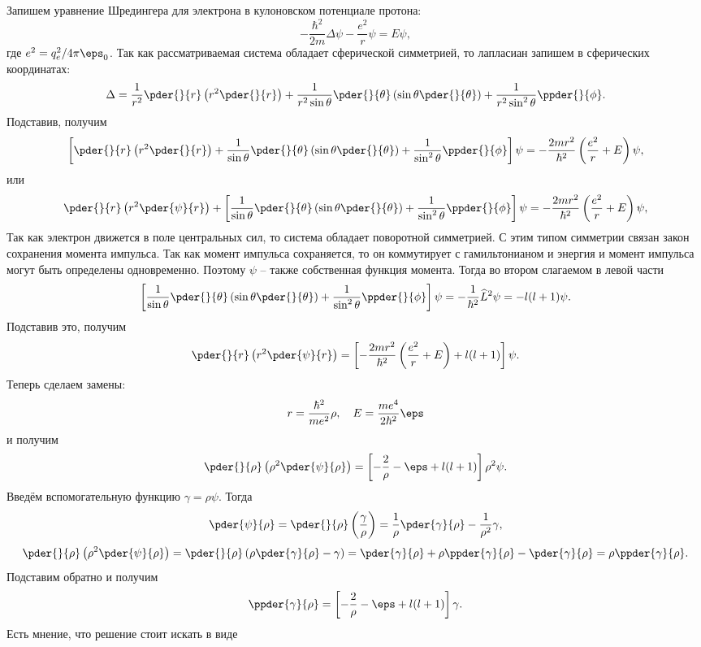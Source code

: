 \documentclass{minimal}
\begin{document}
Запишем уравнение Шредингера для электрона в кулоновском потенциале протона:
\[
    -\frac{\hbar^2}{2m}\Delta\psi - \frac{e^2}{r}\psi = E\psi,
\]
где \( e^2 = q_e^2/4\pi\eps_0 \). Так как рассматриваемая система обладает
сферической симметрией, то лапласиан запишем в сферических координатах:
\[
    \Delta = \frac{1}{r^2}\pder{}{r}\left(r^2\pder{}{r}\right) +
    \frac{1}{r^2\sin\theta}\pder{}{\theta}\left(\sin\theta\pder{}{\theta}\right) +
    \frac{1}{r^2\sin^2\theta}\ppder{}{\phi}.
\]
Подставив, получим
\[
    \left[\pder{}{r}\left(r^2\pder{}{r}\right) +
    \frac{1}{\sin\theta}\pder{}{\theta}\left(\sin\theta\pder{}{\theta}\right) +
    \frac{1}{\sin^2\theta}\ppder{}{\phi}\right]\psi =
    -\frac{2mr^2}{\hbar^2}\left(\frac{e^2}{r}+E\right)\psi,
\]
или
\[
    \pder{}{r}\left(r^2\pder{\psi}{r}\right) +
    \left[
    \frac{1}{\sin\theta}\pder{}{\theta}\left(\sin\theta\pder{}{\theta}\right) +
    \frac{1}{\sin^2\theta}\ppder{}{\phi}\right]\psi =
    -\frac{2mr^2}{\hbar^2}\left(\frac{e^2}{r}+E\right)\psi,
\]
Так как электрон движется в поле центральных сил, то система обладает
поворотной симметрией. С этим типом симметрии связан закон сохранения момента
импульса. Так как момент импульса сохраняется, то он коммутирует
с гамильтонианом и энергия и момент импульса могут быть определены
одновременно. Поэтому \( \psi \) -- также собственная функция момента.
Тогда во втором слагаемом в левой части
\[
    \left[
    \frac{1}{\sin\theta}\pder{}{\theta}\left(\sin\theta\pder{}{\theta}\right) +
    \frac{1}{\sin^2\theta}\ppder{}{\phi}\right]\psi =
    -\frac{1}{\hbar^2}\hat{L}^2\psi = -l(l+1)\psi.
\]
Подставив это, получим
\[
    \pder{}{r}\left(r^2\pder{\psi}{r}\right) =
    \left[-\frac{2mr^2}{\hbar^2}\left(\frac{e^2}{r}+E\right)+l(l+1)\right]\psi.
\]
Теперь сделаем замены:
\[
    r = \frac{\hbar^2}{me^2}\rho,\quad E = \frac{me^4}{2\hbar^2}\eps
\]
и получим
\[
    \pder{}{\rho}\left(\rho^2\pder{\psi}{\rho}\right) =
    \left[-\frac{2}{\rho}-\eps+l(l+1)\right]\rho^2\psi.
\]
Введём вспомогательную функцию \( \gamma = \rho\psi \). Тогда
\[
    \pder{\psi}{\rho} = \pder{}{\rho}\left(\frac{\gamma}{\rho}\right) =
    \frac{1}{\rho}\pder{\gamma}{\rho} - \frac{1}{\rho^2}\gamma,
\]
\[
    \pder{}{\rho}\left(\rho^2\pder{\psi}{\rho}\right) = \pder{}{\rho}\left(
    \rho\pder{\gamma}{\rho} - \gamma\right) = \pder{\gamma}{\rho} + \rho\ppder{\gamma}{\rho} -
    \pder{\gamma}{\rho} = \rho\ppder{\gamma}{\rho}.
\]
Подставим обратно и получим
\[
    \ppder{\gamma}{\rho} =
    \left[-\frac{2}{\rho}-\eps+l(l+1)\right]\gamma.
\]
Есть мнение, что решение стоит искать в виде
\end{document}
